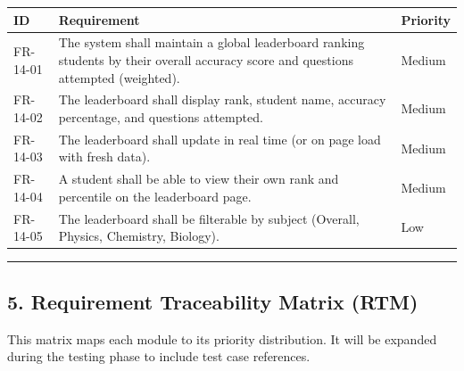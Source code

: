 \documentclass[
]{article}
\begin{document}
\begin{longtable}[]{@{}
  >{\raggedright\arraybackslash}p{}
  >{\raggedright\arraybackslash}p{}
  >{\raggedright\arraybackslash}p{}@{}}
\toprule\noalign{}
\begin{minipage}[b]{\linewidth}\raggedright
ID
\end{minipage} & \begin{minipage}[b]{\linewidth}\raggedright
Requirement
\end{minipage} & \begin{minipage}[b]{\linewidth}\raggedright
Priority
\end{minipage} \\
\midrule\noalign{}
\endhead
\bottomrule\noalign{}
\endlastfoot
FR-14-01 & The system shall maintain a global leaderboard ranking
students by their overall accuracy score and questions attempted
(weighted). & Medium \\
FR-14-02 & The leaderboard shall display rank, student name, accuracy
percentage, and questions attempted. & Medium \\
FR-14-03 & The leaderboard shall update in real time (or on page load
with fresh data). & Medium \\
FR-14-04 & A student shall be able to view their own rank and percentile
on the leaderboard page. & Medium \\
FR-14-05 & The leaderboard shall be filterable by subject (Overall,
Physics, Chemistry, Biology). & Low \\
\end{longtable}

\begin{center}\rule{0.5\linewidth}{0.5pt}\end{center}

\subsection{5. Requirement Traceability Matrix
(RTM)}\label{requirement-traceability-matrix-rtm}

This matrix maps each module to its priority distribution. It will be
expanded during the testing phase to include test case references.
\end{document}
